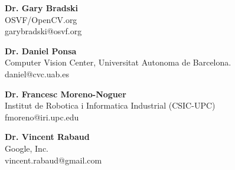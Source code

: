 \textbf{Dr. Gary Bradski}\\
OSVF/OpenCV.org\\
garybradski@osvf.org

\textbf{Dr. Daniel Ponsa}\\
Computer Vision Center, Universitat Autonoma de Barcelona.\\
daniel@cvc.uab.es

\textbf{Dr. Francesc Moreno-Noguer}\\
Institut de Robotica i Informatica Industrial (CSIC-UPC)   
\\
fmoreno@iri.upc.edu

\textbf{Dr. Vincent Rabaud}\\
Google, Inc.\\
vincent.rabaud@gmail.com

